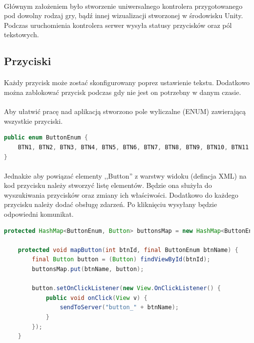 \documentclass[12pt]{article}
\begin{document}
{{\paragraph{}
Głównym założeniem było stworzenie uniwersalnego kontrolera przygotowanego pod dowolny rodzaj gry, bądź innej wizualizacji stworzonej w środowisku Unity. Podczas uruchomienia kontrolera serwer wysyła statusy przycisków oraz pól tekstowych.

\subsection{Przyciski}
\paragraph{}
Każdy przycisk może zostać skonfigurowany poprez ustawienie tekstu. Dodatkowo można zablokować przycisk podczas gdy nie jest on potrzebny w danym czasie.
\paragraph{}
Aby ułatwić pracę nad aplikacją stworzono pole wyliczalne (ENUM) zawierającą wszystkie przyciski.

\begin{lstlisting}[language=Java]
public enum ButtonEnum {
    BTN1, BTN2, BTN3, BTN4, BTN5, BTN6, BTN7, BTN8, BTN9, BTN10, BTN11
}
\end{lstlisting}
\paragraph{}
Jednakże aby powiązać elementy ,,Button'' z warstwy widoku (defincja XML) na kod przycisku  należy stworzyć listę elementów. Będzie ona służyła do wyszukiwania przycisków oraz zmiany ich właściwości. Dodatkowo do każdego przycisku należy dodać obsługę zdarzeń. Po kliknięciu wysyłany będzie odpowiedni komunikat.

\begin{lstlisting}[language=Java]
    protected HashMap<ButtonEnum, Button> buttonsMap = new HashMap<ButtonEnum, Button>();

    protected void mapButton(int btnId, final ButtonEnum btnName) {
        final Button button = (Button) findViewById(btnId);
        buttonsMap.put(btnName, button);

        button.setOnClickListener(new View.OnClickListener() {
            public void onClick(View v) {
                sendToServer("button_" + btnName);
            }
        });
    }
\end{lstlisting}


}}
\end{document}
